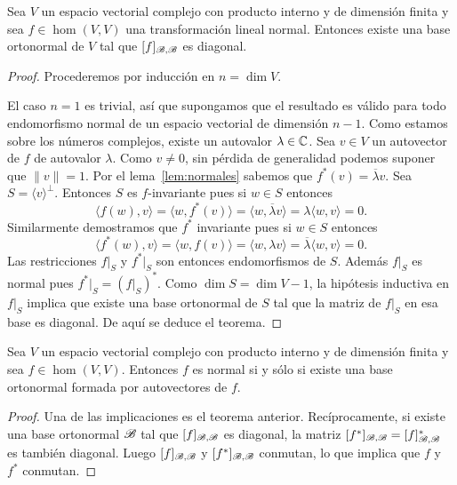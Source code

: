 \begin{thm}
	\label{thm:normales:diagonal}
	Sea $V$ un espacio vectorial complejo con producto interno y de dimensión
	finita y sea $f\in\hom(V,V)$ una transformación lineal normal. Entonces
	existe una base ortonormal de $V$ tal que $[f]_{\mathscr{B},\mathscr{B}}$ es diagonal. 

	\begin{proof}
		Procederemos por inducción en $n=\dim V$. 
		
		El caso $n=1$ es trivial, así que supongamos que el resultado es válido
		para todo endomorfismo normal de un espacio vectorial de dimensión
		$n-1$.  Como estamos sobre los números complejos, existe un autovalor
		$\lambda\in\mathbb{C}$. Sea $v\in V$ un autovector de $f$ de autovalor
		$\lambda$. Como $v\ne 0$, sin pérdida de generalidad podemos suponer
		que $\|v\|=1$. Por el lema~\ref{lem:normales} sabemos que
		$f^*(v)=\overline{\lambda}v$. Sea $S=\langle v\rangle^\perp$. Entonces
		$S$ es $f$-invariante pues si $w\in S$ entonces
		\[
		\langle f(w),v\rangle=\langle w,f^*(v)\rangle=\langle w,\overline{\lambda} v\rangle=\lambda\langle w,v\rangle=0.
		\]
		Similarmente demostramos que $f^*$ invariante pues si $w\in S$ entonces 
		\[
		\langle f^*(w),v\rangle=\langle w,f(v)\rangle=\langle w,\lambda v\rangle=\overline{\lambda}\langle w,v\rangle=0.
		\]
		Las restricciones $f|_S$ y $f^*|_S$ son entonces endomorfismos de $S$.
		Además $f|_S$ es normal pues $f^*|_S=(f|_S)^*$.  Como $\dim S=\dim
		V-1$, la hipótesis inductiva en $f|_S$ implica que existe una base
		ortonormal de $S$ tal que la matriz de $f|_S$ en esa base es diagonal.
		De aquí se deduce el teorema.
	\end{proof}
\end{thm}

\begin{cor}
	Sea $V$ un espacio vectorial complejo con producto interno y de dimensión
	finita y sea $f\in\hom(V,V)$. Entonces $f$ es normal si y sólo si existe
	una base ortonormal formada por autovectores de $f$.

	\begin{proof}
		Una de las implicaciones es el teorema anterior. Recíprocamente, si
		existe una base ortonormal $\mathscr{B}$ tal que $[f]_{\mathscr{B},\mathscr{B}}$ es diagonal,
		la matriz $[f^*]_{\mathscr{B},\mathscr{B}}=[f]_{\mathscr{B},\mathscr{B}}^*$ es también diagonal. Luego
		$[f]_{\mathscr{B},\mathscr{B}}$ y $[f^*]_{\mathscr{B},\mathscr{B}}$ conmutan, lo que implica que $f$ y
		$f^*$ conmutan.
	\end{proof}
\end{cor}

